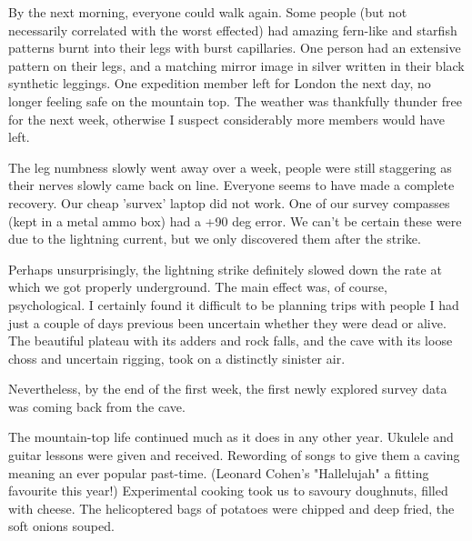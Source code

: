 By the next morning, everyone could walk again. Some people (but not necessarily correlated with the worst effected) had amazing fern-like and starfish patterns burnt into their legs with burst capillaries. One person had an extensive pattern on their legs, and a matching mirror image in silver written in their black synthetic leggings. One expedition member left for London the next day, no longer feeling safe on the mountain top. The weather was thankfully thunder free for the next week, otherwise I suspect considerably more members would have left. 

The leg numbness slowly went away over a week, people were still staggering as their nerves slowly came back on line. Everyone seems to have made a complete recovery. Our cheap 'survex' laptop did not work. One of our survey compasses (kept in a metal ammo box) had a +90 deg error. We can't be certain these were due to the lightning current, but we only discovered them after the strike.

Perhaps unsurprisingly, the lightning strike definitely slowed down the rate at which we got properly underground.  The main effect was, of course, psychological. I certainly found it difficult to be planning trips with people I had just a couple of days previous been uncertain whether they were dead or alive. The beautiful plateau with its adders and rock falls, and the cave with its loose choss and uncertain rigging, took on a distinctly sinister air.

Nevertheless, by the end of the first week, the first newly explored survey data was coming back from the cave.

The mountain-top life continued much as it does in any other year. Ukulele and guitar lessons were given and received. Rewording of songs to give them a caving meaning an ever popular past-time. (Leonard Cohen's "Hallelujah" a fitting favourite this year!) Experimental cooking took us to savoury doughnuts, filled with cheese. The helicoptered bags of potatoes were chipped and deep fried, the soft onions souped.

